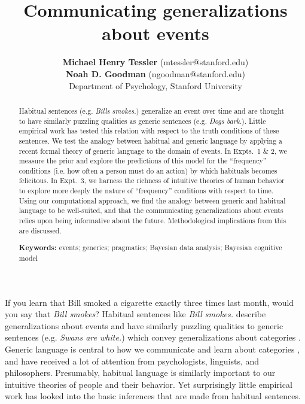 \documentclass[10pt,letterpaper]{article}
\title{Communicating generalizations about events}
\author{{\large \bf Michael Henry Tessler} (mtessler@stanford.edu) \\
 {\large \bf Noah D. Goodman} (ngoodman@stanford.edu) \\
  Department of Psychology, Stanford University}
\begin{document}
\maketitle


\begin{abstract}
Habitual sentences (e.g. \emph{Bills smokes.}) generalize an event over time and are thought to have similarly puzzling qualities as generic sentences (e.g. \emph{Dogs bark.}). 
Little empirical work has tested this relation with respect to the truth conditions of these sentences. 
We test the analogy between habitual and generic language by applying a recent formal theory of generic language to the domain of events.
In Expts.~1 \& 2, we measure the prior and explore the predictions of this model for the
``frequency'' conditions (i.e. how often a person must do an action) 
by which habituals becomes felicitous.
In Expt.~3, we harness the richness of intuitive theories of human behavior to explore more deeply the nature of ``frequency'' conditions with respect to time.
Using our computational approach, we find the analogy between generic and habitual language to be well-suited, and that the communicating generalizations about events relies upon being informative about the future.
Methodological implications from this are discussed.


\textbf{Keywords:} 
events; generics; pragmatics; Bayesian data analysis; Bayesian cognitive model
\end{abstract}


If you learn that Bill smoked a cigarette exactly three times last month, would you say that \emph{Bill smokes}?
Habitual sentences like \emph{Bill smokes.} describe generalizations about events and have similarly puzzling qualities to generic sentences (e.g. \emph{Swans are white.}) which convey generalizations about categories \cite{Carlson2005}.
Generic language is central to how we communicate and learn about categories \cite{Carlson1977, Gelman2004}, and have received a lot of attention from psychologists, linguists, and philosophers.
Presumably, habitual language is similarly important to our intuitive theories of people and their behavior.
Yet surprisingly little empirical work has looked into the basic inferences that are made from habitual sentences.
\end{document}
